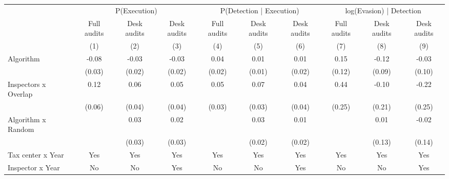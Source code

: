 \begin{tabular}{lccc|ccc|ccc} \toprule
\multicolumn{1}{l}{} & \multicolumn{3}{c}{P(Execution)} & \multicolumn{3}{c}{P(Detection | Execution)} & \multicolumn{3}{c}{log(Evasion) | Detection} \\\cmidrule(lr){2-4}\cmidrule(lr){5-7}\cmidrule(lr){8-10} \multicolumn{1}{l}{} & Full audits & Desk audits & Desk audits & Full audits & Desk audits & Desk audits & Full audits & Desk audits & Desk audits \\ \multicolumn{1}{l}{} & (1) & (2) & (3) & (4) & (5) & (6) & (7) & (8) & (9) \\ \midrule
Algorithm   &       -0.08\sym{***}&       -0.03\sym{*}  &       -0.03\sym{*}  &        0.04\sym{**} &        0.01         &        0.01         &        0.15         &       -0.12         &       -0.03         \\
            &      (0.03)         &      (0.02)         &      (0.02)         &      (0.02)         &      (0.01)         &      (0.02)         &      (0.12)         &      (0.09)         &      (0.10)         \\
\addlinespace
Inspectors x Overlap&        0.12\sym{*}  &        0.06\sym{*}  &        0.05         &        0.05\sym{*}  &        0.07\sym{**} &        0.04         &        0.44\sym{*}  &       -0.10         &       -0.22         \\
            &      (0.06)         &      (0.04)         &      (0.04)         &      (0.03)         &      (0.03)         &      (0.04)         &      (0.25)         &      (0.21)         &      (0.25)         \\
\addlinespace
Algorithm x Random&                     &        0.03         &        0.02         &                     &        0.03         &        0.01         &                     &        0.01         &       -0.02         \\
            &                     &      (0.03)         &      (0.03)         &                     &      (0.02)         &      (0.02)         &                     &      (0.13)         &      (0.14)         \\
\midrule
Tax center x Year&         Yes         &         Yes         &         Yes         &         Yes         &         Yes         &         Yes         &         Yes         &         Yes         &         Yes         \\
Inspector x Year&          No         &          No         &         Yes         &          No         &          No         &         Yes         &          No         &          No         &         Yes         \\

\end{tabular}
